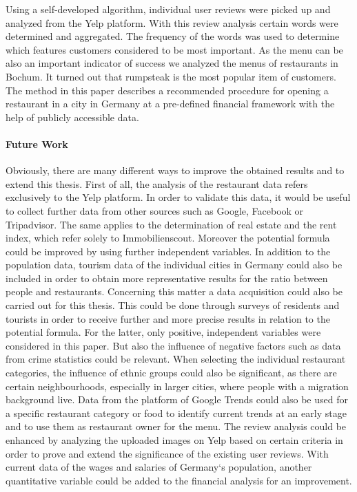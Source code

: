 Using a self-developed algorithm, individual user reviews were picked up and analyzed from the Yelp platform. With this review analysis certain words were determined and aggregated. The frequency of the words was used to determine which features customers considered to be most important. %
\newline
As the menu can be also an important indicator of success we analyzed the menus of restaurants in Bochum. It turned out that rumpsteak is the most popular item of customers.
The method in this paper describes a recommended procedure for opening a restaurant in a city in Germany at a pre-defined financial framework with the help of publicly accessible data.

\paragraph{Future Work}
Obviously, there are many different ways to improve the obtained results and to extend this thesis. First of all, the analysis of the restaurant data refers exclusively to the Yelp platform. In order to validate this data, it would be useful to collect further data from other sources such as Google, Facebook or Tripadvisor. The same applies to the determination of real estate and the rent index, which refer solely to Immobilienscout. \newline
Moreover the potential formula could be improved by using further independent variables. In addition to the population data, tourism data of the individual cities in Germany could also be included in order to obtain more representative results for the ratio between people and restaurants. Concerning this matter a data acquisition could also be carried out for this thesis. This could be done through surveys of residents and tourists in order to receive further and more precise results in relation to the potential formula. For the latter, only positive, independent variables were considered in this paper. But also the influence of negative factors such as data from crime statistics could be relevant. \newline
When selecting the individual restaurant categories, the influence of ethnic groups could also be significant, as there are certain neighbourhoods, especially in larger cities, where people with a migration background live. Data from the platform of Google Trends could also be used for a specific restaurant category or food to identify current trends at an early stage and to use them as restaurant owner for the menu. \newline
The review analysis could be enhanced by analyzing the uploaded images on Yelp based on certain criteria in order to prove and extend the significance of the existing user reviews. With current data of the wages and salaries of Germany‘s population, another quantitative variable could be added to the financial analysis for an improvement. 
